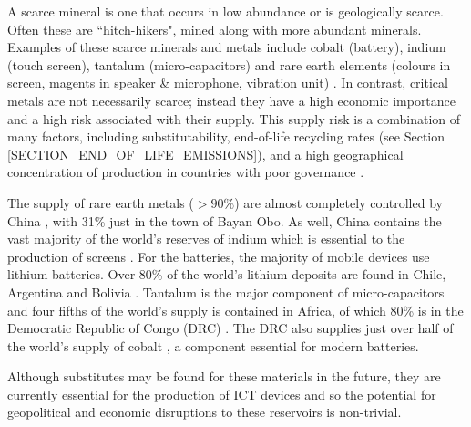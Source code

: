 \documentclass{article}
\begin{document}
A scarce mineral is one that occurs in low abundance or is geologically scarce. Often these are ``hitch-hikers", mined along with more abundant minerals. Examples of these scarce minerals and metals include cobalt (battery), indium (touch screen), tantalum (micro-capacitors) and rare earth elements (colours in screen, magents in speaker \& microphone, vibration unit) \cite{peiro2013material, compoundinterest2014}. In contrast, critical metals are not necessarily scarce; instead they have a high economic importance and a high risk associated with their supply. This supply risk is a combination of many factors, including substitutability, end-of-life recycling rates (see Section \ref{SECTION_END_OF_LIFE_EMISSIONS}), and a high geographical concentration of production in countries with poor governance \cite{eu2014criticalmaterials}.

The supply of rare earth metals ($>90\%$) are almost completely controlled by China \cite{schulz2018critical, physorg2012scarcemetals}, with 31\% just in the town of Bayan Obo. As well, China contains the vast majority of the world's reserves of indium which is essential to the production of screens \cite{reller2009mobile, eu2014criticalmaterials}. For the batteries, the majority of mobile devices use lithium batteries. Over 80\% of the world's lithium deposits are found in Chile, Argentina and Bolivia \cite{reller2009mobile}. Tantalum is the major component of micro-capacitors and four fifths of the world's supply is contained in Africa, of which 80\% is in the Democratic Republic of Congo (DRC) \cite{nzongola2002congo, montague2002stolen}. The DRC also supplies just over half of the world's supply of cobalt \cite{eu2014criticalmaterials}, a component essential for modern batteries.

Although substitutes may be found for these materials in the future, they are currently essential for the production of ICT devices and so the potential for geopolitical and economic disruptions to these reservoirs is non-trivial.


\end{document}
